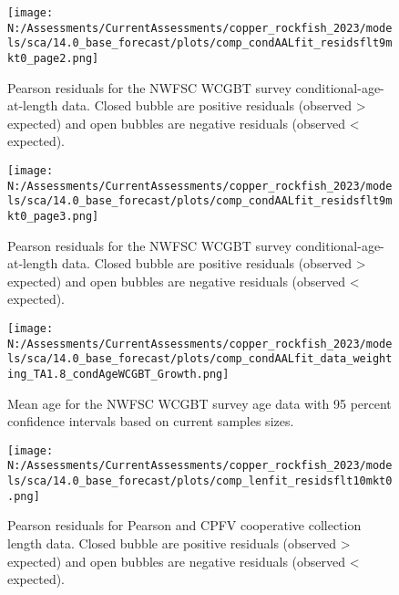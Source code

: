 \documentclass[11pt,
  english,
  letterpaper,
]{article}
\begin{document}
\pagebreak

\begin{figure}
\centering
\texttt{[image: N:/Assessments/CurrentAssessments/copper\_rockfish\_2023/models/sca/14.0\_base\_forecast/plots/comp\_condAALfit\_residsflt9mkt0\_page2.png]}
\caption{Pearson residuals for the NWFSC WCGBT survey conditional-age-at-length data. Closed bubble are positive residuals (observed \textgreater{} expected) and open bubbles are negative residuals (observed \textless{} expected).\label{fig:wcgbt-age-pearson-2}}
\end{figure}

\pagebreak

\begin{figure}
\centering
\texttt{[image: N:/Assessments/CurrentAssessments/copper\_rockfish\_2023/models/sca/14.0\_base\_forecast/plots/comp\_condAALfit\_residsflt9mkt0\_page3.png]}
\caption{Pearson residuals for the NWFSC WCGBT survey conditional-age-at-length data. Closed bubble are positive residuals (observed \textgreater{} expected) and open bubbles are negative residuals (observed \textless{} expected).\label{fig:wcgbt-age-pearson-3}}
\end{figure}

\pagebreak

\begin{figure}
\centering
\texttt{[image: N:/Assessments/CurrentAssessments/copper\_rockfish\_2023/models/sca/14.0\_base\_forecast/plots/comp\_condAALfit\_data\_weighting\_TA1.8\_condAgeWCGBT\_Growth.png]}
\caption{Mean age for the NWFSC WCGBT survey age data with 95 percent confidence intervals based on current samples sizes.\label{fig:wcgbt-mean-age-fit}}
\end{figure}

\pagebreak

\begin{figure}
\centering
\texttt{[image: N:/Assessments/CurrentAssessments/copper\_rockfish\_2023/models/sca/14.0\_base\_forecast/plots/comp\_lenfit\_residsflt10mkt0.png]}
\caption{Pearson residuals for Pearson and CPFV cooperative collection length data. Closed bubble are positive residuals (observed \textgreater{} expected) and open bubbles are negative residuals (observed \textless{} expected).\label{fig:coop-len-pearson}}
\end{figure}

\pagebreak
\end{document}

